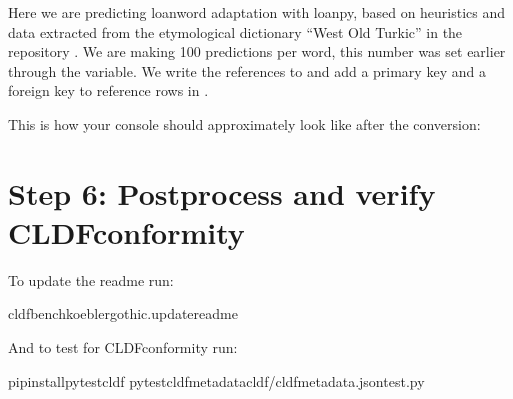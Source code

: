 \documentclass[letterpaper,10pt,english]{sphinxmanual}
\begin{document}
{{{{\begin{sphinxVerbatim}[commandchars=\\\{\}]
   \PYG{p}{[}\PYG{p}{]} 
    \PYG{p}{[}  \PYG{p}{]}
      
\end{sphinxVerbatim}

\sphinxAtStartPar
Here we are predicting loanword adaptation with loanpy, based on heuristics
and data extracted from the etymological dictionary “West Old Turkic”
in the repository . We
are making 100 predictions per word, this number was set earlier through the
 variable. We write the references to
 and add a primary key and a foreign key to reference
rows in .

\sphinxAtStartPar
This is how your console should approximately look like after the conversion:

\noindent{}


\section{Step 6: Post\sphinxhyphen{}process and verify CLDF\sphinxhyphen{}conformity}
\label{\detokenize{mkcldf:step-6-post-process-and-verify-cldf-conformity}}
\sphinxAtStartPar
To update the readme run:

\begin{sphinxVerbatim}[commandchars=\\\{\}]
cldfbenchkoeblergothic.update\PYGZus{}readme
\end{sphinxVerbatim}

\sphinxAtStartPar
And to test for CLDF\sphinxhyphen{}conformity run:

\begin{sphinxVerbatim}[commandchars=\\\{\}]
pipinstallpytest\PYGZhy{}cldf
pytest\PYGZhy{}\PYGZhy{}cldf\PYGZhy{}metadatacldf/cldf\PYGZhy{}metadata.jsontest.py
\end{sphinxVerbatim}

}}}}
\end{document}
